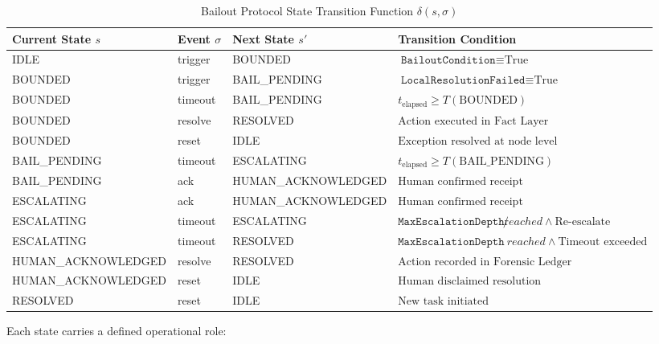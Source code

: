 \begin{table}[htbp]
\caption{Bailout Protocol State Transition Function $\delta(s, \sigma)$}
\label{tab:state_transitions}
\centering
\begin{tabular}{llll}
\toprule
Current State $s$ & Event $\sigma$ & Next State $s'$ & Transition Condition \\
\midrule
IDLE & trigger & BOUNDED & $\texttt{BailoutCondition} \equiv \text{True}$ \\
BOUNDED & trigger & BAIL\_PENDING & $\texttt{LocalResolutionFailed} \equiv \text{True}$ \\
BOUNDED & timeout & BAIL\_PENDING & $t_{\text{elapsed}} \geq T(\text{BOUNDED})$ \\
BOUNDED & resolve & RESOLVED & $\text{Action executed in Fact Layer}$ \\
BOUNDED & reset & IDLE & $\text{Exception resolved at node level}$ \\
BAIL\_PENDING & timeout & ESCALATING & $t_{\text{elapsed}} \geq T(\text{BAIL\_PENDING})$ \\
BAIL\_PENDING & ack & HUMAN\_ACKNOWLEDGED & $\text{Human confirmed receipt}$ \\
ESCALATING & ack & HUMAN\_ACKNOWLEDGED & $\text{Human confirmed receipt}$ \\
ESCALATING & timeout & ESCALATING & $\texttt{MaxEscalationDepth} \not reached \land \text{Re-escalate}$ \\
ESCALATING & timeout & RESOLVED & $\texttt{MaxEscalationDepth} \ reached \land \text{Timeout exceeded}$ \\
HUMAN\_ACKNOWLEDGED & resolve & RESOLVED & $\text{Action recorded in Forensic Ledger}$ \\
HUMAN\_ACKNOWLEDGED & reset & IDLE & $\text{Human disclaimed resolution}$ \\
RESOLVED & reset & IDLE & $\text{New task initiated}$ \\
\bottomrule
\end{tabular}
\end{table}

Each state carries a defined operational role:

